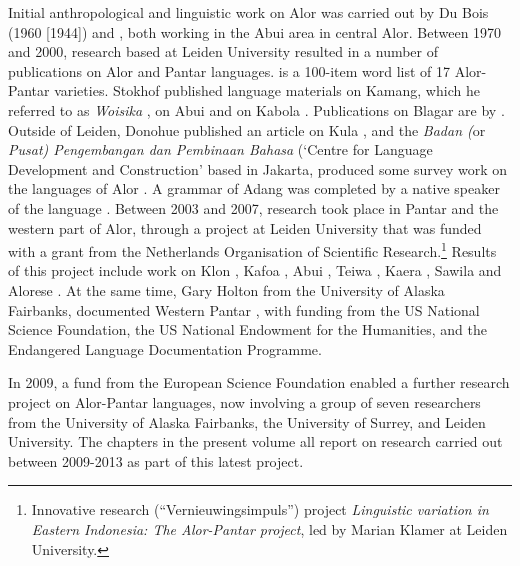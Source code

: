 Initial anthropological and linguistic work on Alor was carried out by Du Bois (1960 [1944]) and \citet{Nicolspeyer1940}, both working in the Abui area in central Alor. Between 1970 and 2000, research based at Leiden University resulted in a number of publications on Alor and Pantar languages. \citet{Stokhof1975} is a 100-item word list of 17 Alor-Pantar varieties. Stokhof published language materials on Kamang, which he referred to as \textit{Woisika} \citep{Stokhof1977,Stokhof1978,Stokhof1979,Stokhof1982,Stokhof1983}, on Abui \citep{Stokhof1984} and on Kabola \citep{Stokhof1987}. Publications on Blagar are by \citet{Steinhauer1977,Steinhauer1991,Steinhauer1993,Steinhauer1995,Steinhauer1999,Steinhauer2010,Steinhauer2012,Steinhauertoappear}. Outside of Leiden, Donohue published an article on Kula \citep{Donohue1996}, and the \textit{Badan (}or \textit{Pusat) Pengembangan dan Pembinaan Bahasa} (`Centre for Language Development and Construction' based in Jakarta, produced some survey work on the languages of Alor \citep{MartisEtAl2000}. A grammar of Adang was completed by a native speaker of the language \citep{Haan2001}.
Between 2003 and 2007, research took place in Pantar and the western part of Alor, through a project at Leiden University that was funded with a grant from the Netherlands Organisation of Scientific Research.\footnote{Innovative research (``Vernieuwingsimpuls'') project \textit{Linguistic variation in Eastern Indonesia: The Alor-Pantar project}, led by Marian Klamer at Leiden University.} Results of this project include work on Klon \citep{Baird2005,Baird2008,Baird2010}, Kafoa \citep{Bairdta}, Abui \citep{Kratochvil2007,KratochvilEtAl2008a,KratochvilEtAl2008b,KlamerEtAl2006,KlamerEtAl2010,Kratochvil2011a,Kratochvil2011b}, Teiwa \citep{Klamer2010a,Klamer2010b,Klamer2010c,KlamerEtAl2006,Klamer2011,Klamer2012}, Kaera \citep{Klamer2010b,Klamerta}, Sawila \citep{Kratochvilta} and Alorese \citep{Klamer2011,Klamer2012}. At the same time, Gary Holton from the University of Alaska Fairbanks, documented Western Pantar \citep{Holton2008,Holton2010a,Holton2011,HoltonEtAl2008,Holtontaa,Holtontab}, with funding from the US National Science Foundation, the US National Endowment for the Humanities, and the Endangered Language Documentation Programme.

In 2009, a fund from the European Science Foundation enabled a further research project on Alor-Pantar languages, now involving a group of seven researchers from the University of Alaska Fairbanks, the University of Surrey, and Leiden University. The chapters in the present volume all report on research carried out between 2009-2013 as part of this latest project.

